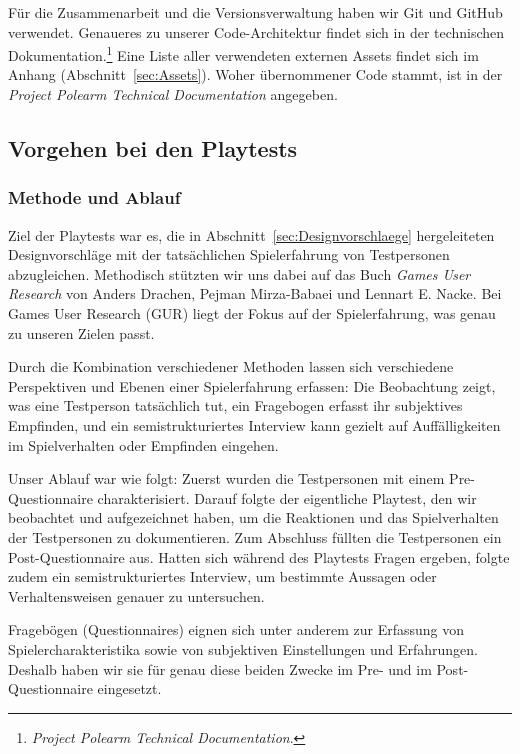\documentclass[../Main.tex]{subfiles}
\begin{document}
Für die Zusammenarbeit und die Versionsverwaltung haben wir Git und GitHub verwendet. Genaueres zu unserer Code-Architektur findet sich in der technischen Dokumentation.\footnote{\textit{Project Polearm Technical Documentation}.} Eine Liste aller verwendeten externen Assets findet sich im Anhang (Abschnitt~\ref{sec:Assets}). Woher übernommener Code stammt, ist in der \textit{Project Polearm Technical Documentation} angegeben.

\subsection{Vorgehen bei den Playtests} \label{sec:VorgehenPlaytest}

\subsubsection{Methode und Ablauf} \label{sec:MethodePlaytest}
Ziel der Playtests war es, die in Abschnitt~\ref{sec:Designvorschlaege} hergeleiteten Designvorschläge mit der tatsächlichen Spielerfahrung von Testpersonen abzugleichen. Methodisch stützten wir uns dabei auf das Buch \textit{Games User Research} von Anders Drachen, Pejman Mirza-Babaei und Lennart E. Nacke.\autocite{drachen2018gamesuserresearch} Bei Games User Research (GUR) liegt der Fokus auf der Spielerfahrung,\autocite[2]{drachen2018gamesuserresearch} was genau zu unseren Zielen passt.

Durch die Kombination verschiedener Methoden lassen sich verschiedene Perspektiven und Ebenen einer Spielerfahrung erfassen: Die Beobachtung zeigt, was eine Testperson tatsächlich tut, ein Fragebogen erfasst ihr subjektives Empfinden, und ein semistrukturiertes Interview kann gezielt auf Auffälligkeiten im Spielverhalten oder Empfinden eingehen.\autocite[112]{drachen2018gamesuserresearch}

Unser Ablauf war wie folgt: Zuerst wurden die Testpersonen mit einem Pre-Questionnaire charakterisiert. Darauf folgte der eigentliche Playtest, den wir beobachtet und aufgezeichnet haben, um die Reaktionen und das Spielverhalten der Testpersonen zu dokumentieren. Zum Abschluss füllten die Testpersonen ein Post-Questionnaire aus. Hatten sich während des Playtests Fragen ergeben, folgte zudem ein semistrukturiertes Interview, um bestimmte Aussagen oder Verhaltensweisen genauer zu untersuchen.

Fragebögen (Questionnaires) eignen sich unter anderem zur Erfassung von Spielercharakteristika sowie von subjektiven Einstellungen und Erfahrungen.\autocite[142--143]{drachen2018gamesuserresearch} Deshalb haben wir sie für genau diese beiden Zwecke im Pre- und im Post-Questionnaire eingesetzt.
\end{document}
